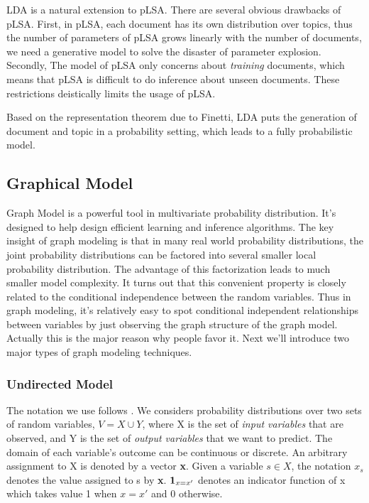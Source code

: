LDA\cite{blei2003latent} is a natural extension to pLSA. There are several obvious drawbacks of pLSA. First, in pLSA, each document has its own distribution over topics, thus the number of parameters of pLSA grows linearly with the number of documents, we need a generative model to solve the disaster of parameter explosion. Secondly, The model of pLSA only concerns about \emph{training} documents, which means that pLSA is difficult to do inference about unseen documents. These restrictions deistically limits the usage of pLSA. 

Based on the representation theorem due to Finetti\cite{de1970theory}, LDA puts the generation of document and topic in a probability setting, which leads to a fully probabilistic model. 

\subsection{Graphical Model}
Graph Model is a powerful tool in multivariate probability distribution. It's designed to help design efficient learning and inference algorithms. The key insight of graph modeling is that in many real world probability distributions, the joint probability distributions can be factored into several smaller local probability distribution. The advantage of this factorization leads to much smaller model complexity. It turns out that this convenient property is closely related to the conditional independence between the random variables. Thus in graph modeling, it's relatively easy to spot conditional independent relationships between variables by just observing the graph structure of the graph model. Actually this is the major reason why people favor it. Next we'll introduce two major types of graph modeling techniques. 

\subsubsection{Undirected Model}
The notation we use follows \cite{}. We considers probability distributions over two sets of random variables, $V=X \cup Y$, where X is the set of \emph{input variables} that are observed, and Y is the set of \emph{output variables} that we want to predict. The domain of each variable's outcome can be continuous or discrete. An arbitrary assignment to X is denoted by a vector {\bf x}. Given a variable $s \in X$, the notation $x_{s}$ denotes the value assigned to s by {\bf x}. ${\bf 1}_{x=x'}$ denotes an indicator function of x which takes value 1 when $x=x'$ and 0 otherwise. 

